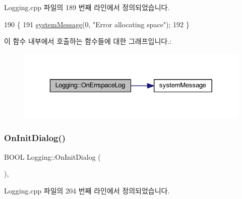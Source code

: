Logging.\+cpp 파일의 189 번째 라인에서 정의되었습니다.


\begin{DoxyCode}
190 \{
191   \mbox{\hyperlink{system_8cpp_a747a9cb8e015a3d45cca636b5bd0fc69}{systemMessage}}(0, \textcolor{stringliteral}{"Error allocating space"});
192 \}
\end{DoxyCode}
이 함수 내부에서 호출하는 함수들에 대한 그래프입니다.\+:
\nopagebreak
\begin{figure}[H]
\begin{center}
\leavevmode
\includegraphics[width=329pt]{class_logging_afe62d9f99dd8178d053c88adb90fc120_cgraph}
\end{center}
\end{figure}
\mbox{\label{class_logging_a5a0a6200a3d55702597a73f7fe8794f5}} 
\subsubsection{\texorpdfstring{On\+Init\+Dialog()}{OnInitDialog()}}
{\footnotesize\ttfamily B\+O\+OL Logging\+::\+On\+Init\+Dialog (\begin{DoxyParamCaption}{ }\end{DoxyParamCaption})\hspace{0.3cm}{\ttfamily [protected]}, {\ttfamily [virtual]}}



Logging.\+cpp 파일의 204 번째 라인에서 정의되었습니다.


